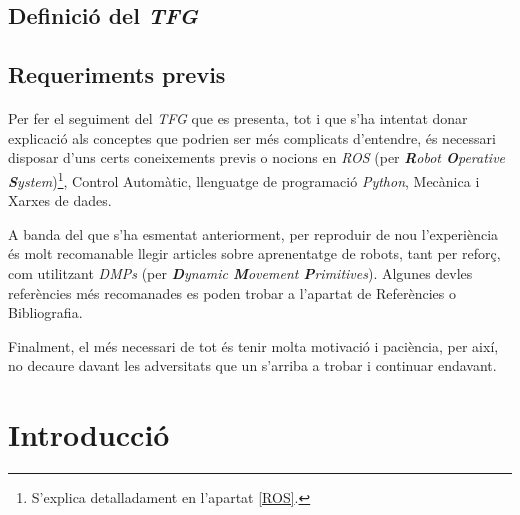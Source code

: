 \documentclass[12pt,a4paper,final,twoside]{article}
\begin{document}
\subsection*{Definició del \textit{TFG}}
\label{Definicio-del-TFG}



\subsection*{Requeriments previs}
\label{Requeriments}

\paragraph{}Per fer el seguiment del \textit{TFG} que es presenta, tot i que s'ha intentat donar explicació als conceptes que podrien ser més complicats d'entendre, és necessari disposar d'uns certs coneixements previs o nocions en \textit{ROS} (per \textit{\textbf{R}obot \textbf{O}perative \textbf{S}ystem})\footnote{S'explica detalladament en l'apartat \ref{ROS}.}, Control Automàtic, llenguatge de programació \textit{Python}, Mecànica i Xarxes de dades.

A banda del que s'ha esmentat anteriorment, per reproduir de nou l'experiència és molt recomanable llegir articles sobre aprenentatge de robots, tant per reforç, com utilitzant \textit{DMPs} (per \textit{\textbf{D}ynamic \textbf{M}ovement \textbf{P}rimitives}). Algunes devles referències més recomanades es poden trobar a l'apartat de Referències o Bibliografia.

Finalment, el més necessari de tot és tenir molta motivació i paciència, per així, no decaure davant les adversitats que un s'arriba a trobar i continuar endavant.

\newpage

\section{Introducció}
\label{Introduccio}
\end{document}
